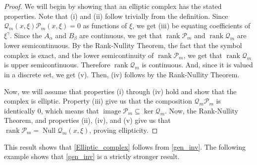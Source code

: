 \documentclass{amsart}
\theoremstyle{definition}
\numberwithin{equation}{section}
\begin{document}
\begin{proof}
We will begin by showing that an elliptic complex has the stated properties.  Note that (i) and (ii) follow trivially from the definition.  Since ${\mathcal{Q}}_m(x,\xi) {\mathcal{P}}_m(x,\xi)=0$ as functions of $\xi$, we get (iii) be equating coefficients of $\xi^{\gamma}$.  Since the $A_{\alpha}$ and $B_{\beta}$ are continuous, we get that $\operatorname{rank} {\mathcal{P}}_m$ and $\operatorname{rank} {\mathcal{Q}}_m$ are lower semicontinuous.  By the Rank-Nullity Theorem, the fact that the symbol complex is exact, and the lower semicontinuity of $\operatorname{rank} {\mathcal{P}}_m$, we get that $\operatorname{rank} {\mathcal{Q}}_m$ is upper semicontinuous.  Therefore $\operatorname{rank} {\mathcal{Q}}_m$ is continuous.  And, since it is valued in a discrete set, we get (v).  Then, (iv) follows by the Rank-Nullity Theorem.

Now, we will assume that properties (i) through (iv) hold and show that the complex is elliptic.  Property (iii) give us that the composition ${\mathcal{Q}}_m{\mathcal{P}}_m$ is identically $0$, which means that $\operatorname{image}{\mathcal{P}}_m \subseteq \ker {\mathcal{Q}}_m$.  Now, the Rank-Nullity Theorem, and properties (ii), (iv), and (v) give us that $\operatorname{rank} {\mathcal{P}}_m = \operatorname{Null}{\mathcal{Q}}_m(x,\xi)$, proving ellipticity.

\end{proof}

This result shows that \autoref{Elliptic_complex} follows from \autoref{gen_inv}.  The following example shows that \autoref{gen_inv} is a strictly stronger result.
\end{document}
